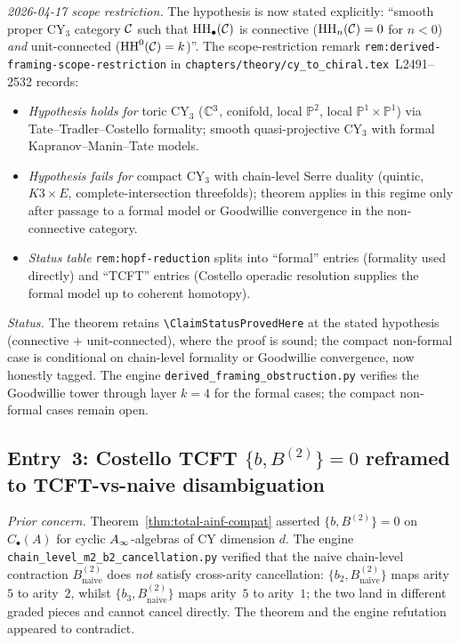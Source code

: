 \emph{2026-04-17 scope restriction.} The hypothesis is now stated
explicitly: ``smooth proper CY$_3$ category $\mathcal{C}$ such that
$\mathrm{HH}_\bullet(\mathcal{C})$ is connective ($\mathrm{HH}_n(\mathcal{C}) = 0$ for $n < 0$)
\emph{and} unit-connected ($\mathrm{HH}^0(\mathcal{C}) = k$)''.  The scope-restriction
remark \texttt{rem:derived-framing-scope-restriction} in
\texttt{chapters/theory/cy\_to\_chiral.tex}~L2491--2532 records:
\begin{itemize}
 \item \emph{Hypothesis holds for} toric CY$_3$ ($\mathbb{C}^3$, conifold,
  local $\mathbb{P}^2$, local $\mathbb{P}^1 \times \mathbb{P}^1$) via
  Tate--Tradler--Costello formality; smooth quasi-projective CY$_3$
  with formal Kapranov--Manin--Tate models.
 \item \emph{Hypothesis fails for} compact CY$_3$ with chain-level
  Serre duality (quintic, $K3 \times E$, complete-intersection
  threefolds); theorem applies in this regime only after passage to a
  formal model or Goodwillie convergence in the non-connective category.
 \item \emph{Status table} \texttt{rem:hopf-reduction} splits into
  ``formal'' entries (formality used directly) and ``TCFT'' entries
  (Costello operadic resolution supplies the formal model up to
  coherent homotopy).
\end{itemize}

\emph{Status.} \ClaimStatusHealed{}  The theorem retains
\texttt{\textbackslash ClaimStatusProvedHere} at the stated hypothesis
(connective $+$ unit-connected), where the proof is sound; the compact
non-formal case is conditional on chain-level formality or Goodwillie
convergence, now honestly tagged.  The engine
\texttt{derived\_framing\_obstruction.py} verifies the Goodwillie tower
through layer $k = 4$ for the formal cases; the compact non-formal
cases remain open.

\subsection*{Entry~3: Costello TCFT $\{b, B^{(2)}\} = 0$ reframed to
TCFT-vs-naive disambiguation}
\label{wn:sec:tautology-healing-entry3}

\emph{Prior concern.} Theorem~\ref{thm:total-ainf-compat} asserted
$\{b, B^{(2)}\} = 0$ on $C_\bullet(A)$ for cyclic $A_{\infty}$-algebras of
CY dimension $d$.  The engine
\texttt{chain\_level\_m2\_b2\_cancellation.py} verified that the naive
chain-level contraction $B^{(2)}_{\mathrm{naive}}$ does \emph{not}
satisfy cross-arity cancellation: $\{b_2, B^{(2)}_{\mathrm{naive}}\}$
maps arity~$5$ to arity~$2$, whilst
$\{b_3, B^{(2)}_{\mathrm{naive}}\}$ maps arity~$5$ to arity~$1$; the
two land in different graded pieces and cannot cancel directly.  The
theorem and the engine refutation appeared to contradict.

